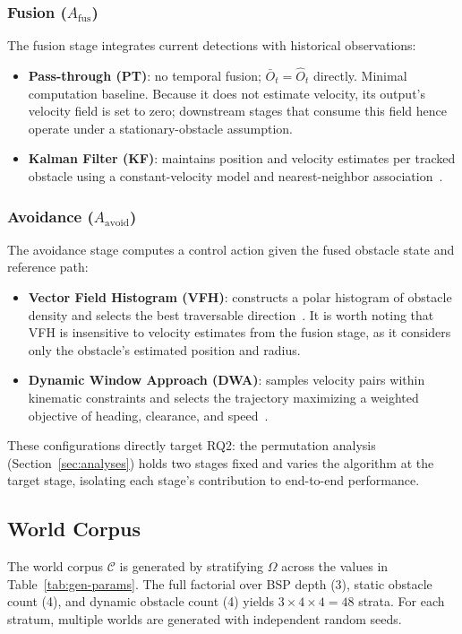 \documentclass[conference]{IEEEtran}
\begin{document}
\subsubsection{Fusion ($A_{\text{fus}}$)}
The fusion stage integrates current detections with historical observations:
\begin{itemize}
    \item \textbf{Pass-through (PT)}: no temporal fusion; $\bar{O}_t = \hat{O}_t$ directly. Minimal computation baseline. Because it does not estimate velocity, its output's velocity field is set to zero; downstream stages that consume this field hence operate under a stationary-obstacle assumption. 
    \item \textbf{Kalman Filter (KF)}: maintains position and velocity estimates per tracked obstacle using a constant-velocity model and nearest-neighbor association~\cite{welch1995kalman}.
\end{itemize}
 
\subsubsection{Avoidance ($A_{\text{avoid}}$)}
The avoidance stage computes a control action given the fused obstacle state and reference path:
\begin{itemize}
    \item \textbf{Vector Field Histogram (VFH)}: constructs a polar histogram of obstacle density and selects the best traversable direction~\cite{borenstein1991vfh}. It is worth noting that VFH is insensitive to velocity estimates from the fusion stage, as it considers only the obstacle's estimated position and radius.
    \item \textbf{Dynamic Window Approach (DWA)}: samples velocity pairs within kinematic constraints and selects the trajectory maximizing a weighted objective of heading, clearance, and speed~\cite{fox1997dwa}.
\end{itemize}
 
These configurations directly target RQ2: the permutation analysis (Section~\ref{sec:analyses}) holds two stages fixed and varies the algorithm at the target stage, isolating each stage's contribution to end-to-end performance.

\subsection{World Corpus}
\label{sec:corpus}
The world corpus $\mathcal{C}$ is generated by stratifying $\Omega$ across the values in Table~\ref{tab:gen-params}. The full factorial over BSP depth (3), static obstacle count (4), and dynamic obstacle count (4) yields $3 \times 4 \times 4 = 48$ strata. For each stratum, multiple worlds are generated with independent random seeds.
\end{document}
